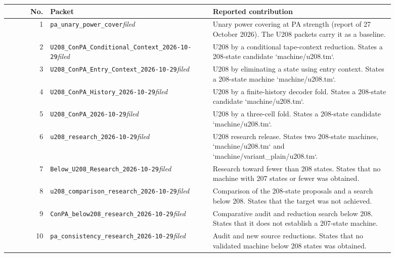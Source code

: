 \small
\begin{longtable}{@{}rp{0.42\linewidth}p{0.47\linewidth}@{}}
\toprule No. & Packet & Reported contribution \\
\midrule\endhead
1 & \nolinkurl{pa_unary_power_cover}\newline\emph{filed} & Unary power covering at PA strength (report of 27 October 2026). The U208 packets carry it as a baseline. \\[2pt]
2 & \nolinkurl{U208_ConPA_Conditional_Context_2026-10-29}\newline\emph{filed} & U208 by a conditional tape-context reduction. States a 208-state candidate `machine/u208.tm`. \\[2pt]
3 & \nolinkurl{U208_ConPA_Entry_Context_2026-10-29}\newline\emph{filed} & U208 by eliminating a state using entry context. States a 208-state machine `machine/u208.tm`. \\[2pt]
4 & \nolinkurl{U208_ConPA_History_2026-10-29}\newline\emph{filed} & U208 by a finite-history decoder fold. States a 208-state candidate `machine/u208.tm`. \\[2pt]
5 & \nolinkurl{U208_ConPA_2026-10-29}\newline\emph{filed} & U208 by a three-cell fold. States a 208-state candidate `machine/u208.tm`. \\[2pt]
6 & \nolinkurl{u208_research_2026-10-29}\newline\emph{filed} & U208 research release. States two 208-state machines, `machine/u208.tm` and `machine/variant\_plain/u208.tm`. \\[2pt]
7 & \nolinkurl{Below_U208_Research_2026-10-29}\newline\emph{filed} & Research toward fewer than 208 states. States that no machine with 207 states or fewer was obtained. \\[2pt]
8 & \nolinkurl{u208_comparison_research_2026-10-29}\newline\emph{filed} & Comparison of the 208-state proposals and a search below 208. States that the target was not achieved. \\[2pt]
9 & \nolinkurl{ConPA_below208_research_2026-10-29}\newline\emph{filed} & Comparative audit and reduction search below 208. States that it does not establish a 207-state machine. \\[2pt]
10 & \nolinkurl{pa_consistency_research_2026-10-29}\newline\emph{filed} & Audit and new source reductions. States that no validated machine below 208 states was obtained. \\[2pt]

\end{longtable}
